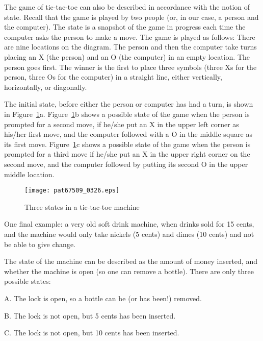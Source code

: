 \documentclass{patt}
\begin{document}
\FloatBarrier
The game of tic-tac-toe can also be described in accordance with the
notion of state.  Recall that the game is played by two people (or, in
our case, a person and the computer).  The state is a snapshot of the
game in progress each time the computer asks the person to make a
move.  The game is played as follows: There are nine locations on the
diagram.  The person and then the computer take turns placing an X
(the person) and an O (the computer) in an empty location.  The person
goes first.  The winner is the first to place three symbols (three Xs
for the person, three Os for the computer) in a straight line, either
vertically, horizontally, or diagonally.

The initial state, before either the person or computer has had a
turn, is shown in Figure~\ref{fig:tictactoe}a.  Figure~\ref{fig:tictactoe}b 
shows a possible state of the game when the person is prompted for a second 
move, if he/she put an X in the upper left corner as his/her first move, and 
the computer followed with a O in the middle square as its first move.
Figure~\ref{fig:tictactoe}c shows a possible state of the game when the 
person is prompted for a third move if he/she put an X in the upper right
corner on the second move, and the computer followed by putting its second O 
in the upper middle location.

\begin{figure}
\centerline{\texttt{[image: pat67509\_0326.eps]}}
\caption{Three states in a tic-tac-toe machine}\label{fig:tictactoe}
\end{figure}

\FloatBarrier
One final example: a very old soft drink machine, when drinks sold for 15
cents, and the machine would only take nickels (5 cents) and dimes (10 cents)
and not be able to give change.

The state of the machine can be described as the amount of money
inserted, and whether the machine is open (so one can remove a bottle).
There are only three possible states: 


\begin{list}{}{\small\ttfamily\obeylines
    \settowidth{\labelwidth}{1.}%
    \setlength{\itemsep}{4pt}%
    \addtolength{\leftmargin}{\labelwidth}%
    \addtolength{\leftmargin}{\labelsep}%
    \def\makelabel#1{\hbox to \labelwidth{{#1}\hss}}%
    \setlength{\labelsep}{7pt}\fontsize{9}{10}\selectfont\ttfamily\obeylines\color{seventyblack}}
\item[A.] The lock is open, so a bottle can be (or has been!) removed.
\item[B.] The lock is not open, but 5 cents has been inserted.
\item[C.] The lock is not open, but 10 cents has been inserted. 
\end{list}
\end{document}

